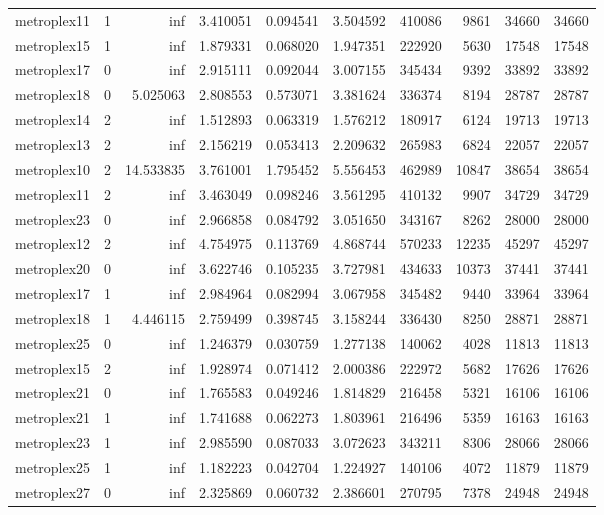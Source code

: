 \documentclass[../../../thesis.tex]{subfiles}
\begin{document}
\begin{longtable}{|l|r|r|r|r|r|r|r|r|r|}
metroplex11 & 1 & inf & 3.410051 & 0.094541 & 3.504592 & 410086 & 9861 & 34660 & 34660 \\
metroplex15 & 1 & inf & 1.879331 & 0.068020 & 1.947351 & 222920 & 5630 & 17548 & 17548 \\
metroplex17 & 0 & inf & 2.915111 & 0.092044 & 3.007155 & 345434 & 9392 & 33892 & 33892 \\
metroplex18 & 0 & 5.025063 & 2.808553 & 0.573071 & 3.381624 & 336374 & 8194 & 28787 & 28787 \\
metroplex14 & 2 & inf & 1.512893 & 0.063319 & 1.576212 & 180917 & 6124 & 19713 & 19713 \\
metroplex13 & 2 & inf & 2.156219 & 0.053413 & 2.209632 & 265983 & 6824 & 22057 & 22057 \\
metroplex10 & 2 & 14.533835 & 3.761001 & 1.795452 & 5.556453 & 462989 & 10847 & 38654 & 38654 \\
metroplex11 & 2 & inf & 3.463049 & 0.098246 & 3.561295 & 410132 & 9907 & 34729 & 34729 \\
metroplex23 & 0 & inf & 2.966858 & 0.084792 & 3.051650 & 343167 & 8262 & 28000 & 28000 \\
metroplex12 & 2 & inf & 4.754975 & 0.113769 & 4.868744 & 570233 & 12235 & 45297 & 45297 \\
metroplex20 & 0 & inf & 3.622746 & 0.105235 & 3.727981 & 434633 & 10373 & 37441 & 37441 \\
metroplex17 & 1 & inf & 2.984964 & 0.082994 & 3.067958 & 345482 & 9440 & 33964 & 33964 \\
metroplex18 & 1 & 4.446115 & 2.759499 & 0.398745 & 3.158244 & 336430 & 8250 & 28871 & 28871 \\
metroplex25 & 0 & inf & 1.246379 & 0.030759 & 1.277138 & 140062 & 4028 & 11813 & 11813 \\
metroplex15 & 2 & inf & 1.928974 & 0.071412 & 2.000386 & 222972 & 5682 & 17626 & 17626 \\
metroplex21 & 0 & inf & 1.765583 & 0.049246 & 1.814829 & 216458 & 5321 & 16106 & 16106 \\
metroplex21 & 1 & inf & 1.741688 & 0.062273 & 1.803961 & 216496 & 5359 & 16163 & 16163 \\
metroplex23 & 1 & inf & 2.985590 & 0.087033 & 3.072623 & 343211 & 8306 & 28066 & 28066 \\
metroplex25 & 1 & inf & 1.182223 & 0.042704 & 1.224927 & 140106 & 4072 & 11879 & 11879 \\
metroplex27 & 0 & inf & 2.325869 & 0.060732 & 2.386601 & 270795 & 7378 & 24948 & 24948 \\

\end{longtable}
\end{document}
